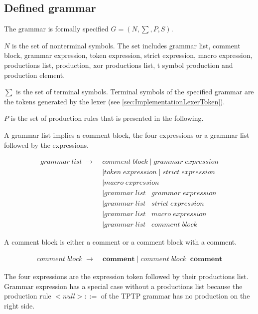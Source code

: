 \subsection{Defined grammar}\label{sec:ImplementationGrammar}
The grammar is formally specified $G = (N,\sum,P,S)$.

$N$ is the set of nonterminal symbols. The set includes grammar list, comment block, grammar expression, token expression, strict expression, macro expression, productions list, production, xor productions list, t symbol production and production element.

$\sum$ is the set of terminal symbols. Terminal symbols of the specified grammar are the tokens generated by the lexer (see \ref{sec:ImplementationLexerToken}).

$P$ is the set of production rules that is presented in the following. 

A grammar list implies a comment block, the four expressions or a grammar list followed by the expressions.

\begin{align*}
	grammar\;list\; \rightarrow\; &comment\;block
	     		\mid grammar\;expression  \\
			   &\mid token\;expression
                \mid strict\;expression\\
               &\mid macro\;expression \\
               &\mid grammar\;list\;\;\;grammar\;expression\\
               &\mid grammar\;list\;\;\;strict\;expression \\
               &\mid grammar\;list\;\;\;macro\;expression \\
               &\mid grammar\;list\;\;\;comment\;block               
\end{align*}

A comment block is either a comment or a comment block with a comment.

\begin{align*}
    comment\;block\; \rightarrow\; &\textbf{comment}
                \mid comment\;block\;\;\textbf{comment}
\end{align*}

The four expressions are the expression token followed by their productions list. Grammar expression has a special case without a productions list because the production rule $<null>::= $ of the \ac{TPTP} grammar has no production on the right side. 

